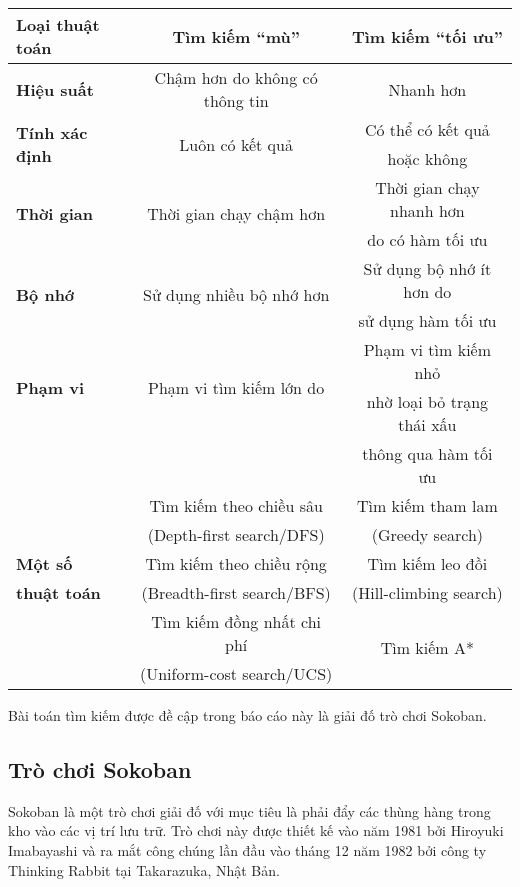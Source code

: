 \begin{center}
	\begin{tabular}{|l|c|c|}
		\hline
		 \textbf{Loại thuật toán} & \textbf{Tìm kiếm ``mù''} & \textbf{Tìm kiếm ``tối ưu''} \\ \hline
		 \textbf{Hiệu suất} & Chậm hơn do không có thông tin & Nhanh hơn \\ \hline
		 \multirow{2}{*}{\textbf{Tính xác định}} & \multirow{2}{*}{Luôn có kết quả} & Có thể có kết quả \\
		 & & hoặc không \\ \hline
		 \multirow{2}{*}{\textbf{Thời gian}} & \multirow{2}{*}{Thời gian chạy chậm hơn} & Thời gian chạy nhanh hơn \\
		 & & do có hàm tối ưu \\ \hline
		 \multirow{2}{*}{\textbf{Bộ nhớ}} & \multirow{2}{*}{Sử dụng nhiều bộ nhớ hơn} & Sử dụng bộ nhớ ít hơn do \\
		 & & sử dụng hàm tối ưu \\ \hline
		 \multirow{2}{*}{\textbf{Phạm vi}} & \multirow{2}{*}{Phạm vi tìm kiếm lớn do} & Phạm vi tìm kiếm nhỏ \\
		 \multirow{2}{*}{\textbf{tìm kiếm}} & \multirow{2}{*}{không loại bỏ trạng thái xấu} & nhờ loại bỏ trạng thái xấu \\
		  & & thông qua hàm tối ưu \\ \hline
		  & Tìm kiếm theo chiều sâu & Tìm kiếm tham lam \\
		  & (Depth-first search/DFS) & (Greedy search) \\
		 \textbf{Một số} & Tìm kiếm theo chiều rộng & Tìm kiếm leo đồi \\
		 \textbf{thuật toán} & (Breadth-first search/BFS) & (Hill-climbing search) \\
		  & Tìm kiếm đồng nhất chi phí & \multirow{2}{*}{Tìm kiếm A*} \\
		  & (Uniform-cost search/UCS) & \\ \hline
	\end{tabular}
\end{center}

Bài toán tìm kiếm được đề cập trong báo cáo này là giải đố trò chơi Sokoban.

\subsection{Trò chơi Sokoban}
Sokoban là một trò chơi giải đố với mục tiêu là phải đẩy các thùng hàng trong kho vào các vị trí lưu trữ. Trò chơi này được thiết kế vào năm 1981 bởi Hiroyuki Imabayashi và ra mắt công chúng lần đầu vào tháng 12 năm 1982 bởi công ty Thinking Rabbit tại Takarazuka, Nhật Bản. \cite{sokoban-wiki}

